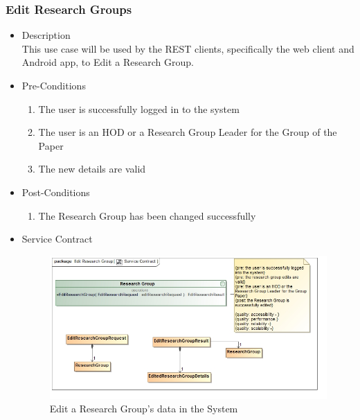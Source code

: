 \documentclass[a4paper,10pt]{article}
\begin{document}
\subsubsection{Edit Research Groups}
	\begin{itemize}
		\item Description\\
			This use case will be used by the REST clients, specifically the web client and Android app, to Edit a Research Group.
		\item Pre-Conditions
			\begin{enumerate}
				\item The user is successfully logged in to the system
				\item The user is an HOD or a Research Group Leader for the Group of the Paper
				\item The new details are valid
			\end{enumerate}
		\item Post-Conditions
			\begin{enumerate}
				\item The Research Group has been changed successfully
						
			\end{enumerate}
		\item Service Contract
			\begin{figure}[H]
				\includegraphics[scale=0.5]{Edit_Research_Group.jpg}
				\caption{Edit a Research Group's data in the System}
			\end{figure}
	\end{itemize}
\end{document}

